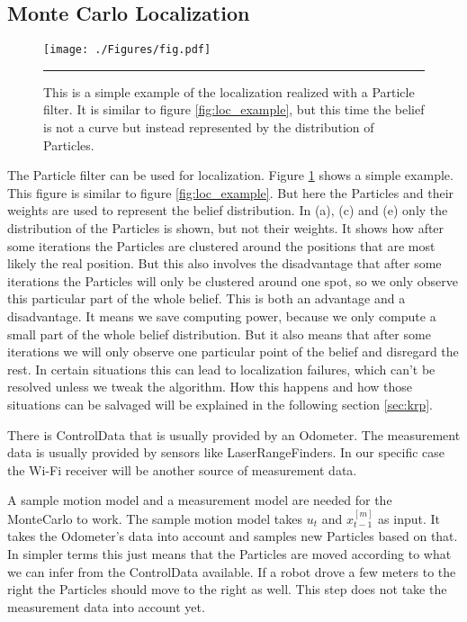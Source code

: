 \subsection{Monte Carlo Localization}\label{sec:montecarlo}
\begin{figure}[htbp]
	\centering
		\texttt{[image: ./Figures/fig.pdf]}
		\rule{35em}{0.5pt}
	\caption[Simple example of localization with \gls{Particle} filter]{This is a simple example of the localization realized with a \gls{Particle} filter. It is similar to figure \ref{fig:loc_example}, but this time the belief is not a curve but instead represented by the distribution of \gls{Particle}s\citep[p. 251]{Thrun:2005:PR:1121596}.}
	\label{fig:particle_localization}
\end{figure}
The \gls{Particle} filter can be used for localization\citep[p. 252]{Thrun:2005:PR:1121596}. Figure \ref{fig:particle_localization} shows a simple example. This figure is similar to figure \ref{fig:loc_example}. But here the \gls{Particle}s and their weights are used to represent the belief distribution. In (a), (c) and (e) only the distribution of the \gls{Particle}s is shown, but not their weights. It shows how after some iterations the \gls{Particle}s are clustered around the positions that are most likely the real position. But this also involves the disadvantage that after some iterations the \gls{Particle}s will only be clustered around one spot, so we only observe this particular part of the whole belief. This is both an advantage and a disadvantage. It means we save computing power, because we only compute a small part of the whole belief distribution. But it also means that after some iterations we will only observe one particular point of the belief and disregard the rest. In certain situations this can lead to localization failures, which can't be resolved unless we tweak the algorithm. How this happens and how those situations can be salvaged will be explained in the following section \ref{sec:krp}.

There is \gls{ControlData} that is usually provided by an \gls{Odometer}. The measurement data is usually provided by sensors like \glspl{LaserRangeFinder}. In our specific case the Wi-Fi receiver will be another source of measurement data. 

A sample motion model and a measurement model are needed for the \Gls{MonteCarlo} to work. The sample motion model takes $u_t$ and $x_{t-1}^{[m]}$ as input. It takes the \gls{Odometer}'s data into account and samples new \gls{Particle}s based on that. In simpler terms this just means that the \gls{Particle}s are moved according to what we can infer from the \gls{ControlData} available. If a robot drove a few meters to the right the \gls{Particle}s should move to the right as well. This step does not take the measurement data into account yet.

